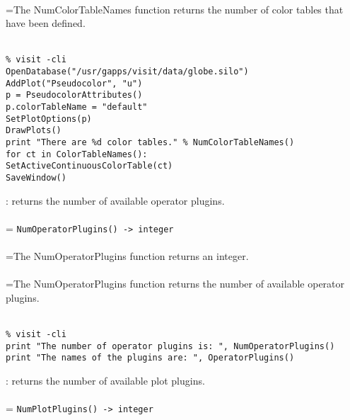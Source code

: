 \documentclass[10pt,a4paper]{report}
\begin{document}
 \\ 
\hangindent=\parindent The NumColorTableNames function returns the number of color tables that have been defined. \\[-3mm] 

\\[-6mm]
\begin{verbatim}% visit -cli
OpenDatabase("/usr/gapps/visit/data/globe.silo")
AddPlot("Pseudocolor", "u")
p = PseudocolorAttributes()
p.colorTableName = "default"
SetPlotOptions(p)
DrawPlots()
print "There are %d color tables." % NumColorTableNames()
for ct in ColorTableNames():
SetActiveContinuousColorTable(ct)
SaveWindow()
\end{verbatim}
\newpage


{}
: returns the number of available operator plugins.\\[-3mm]

 \\ 
\hangindent=\parindent 
\verb!NumOperatorPlugins() -> integer!\\ [-3mm]

 \\ 
\hangindent=\parindent The NumOperatorPlugins function returns an integer. \\[-3mm] 

 \\ 
\hangindent=\parindent The NumOperatorPlugins function returns the number of available operator plugins. \\[-3mm] 

\\[-6mm]
\begin{verbatim}% visit -cli
print "The number of operator plugins is: ", NumOperatorPlugins()
print "The names of the plugins are: ", OperatorPlugins()
\end{verbatim}
\newpage


{}
: returns the number of available plot plugins.\\[-3mm]

 \\ 
\hangindent=\parindent 
\verb!NumPlotPlugins() -> integer!\\ [-3mm]
\end{document}
